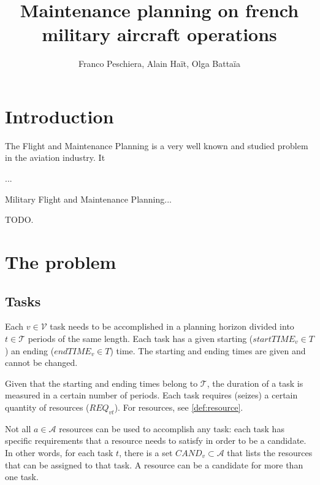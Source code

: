 \documentclass{roadef}
\begin{document}
\title{Maintenance planning on french military aircraft operations}

\def\shorttitle{Titre court}

\author{Franco Peschiera, Alain Haït, Olga Battaïa }




\maketitle
\thispagestyle{empty}



\section{Introduction}

The Flight and Maintenance Planning is a very well known and studied problem in the aviation industry. It

...

Military Flight and Maintenance Planning...

TODO.


\section{The problem}


    \subsection{Tasks}
    \label{def:task}

    Each $v \in \mathcal{V}$ task needs to be accomplished in a planning horizon divided into $t \in \mathcal{T}$ periods of the same length. Each task has a given starting ($startTIME_v \in T$) an ending ($endTIME_v \in T$) time. The starting and ending times are given and cannot be changed.

    Given that the starting and ending times belong to $\mathcal{T}$, the duration of a task is measured in a certain number of periods. Each task requires (seizes) a certain quantity of resources ($REQ_{vt}$). For resources, see \ref{def:resource}.

    Not all $a \in \mathcal{A}$ resources can be used to accomplish any task: each task has specific requirements that a resource needs to satisfy in order to be a candidate. In other words, for each task $t$, there is a set $CAND_{v} \subset \mathcal{A}$ that lists the resources that can be assigned to that task. A resource can be a candidate for more than one task.
\end{document}
